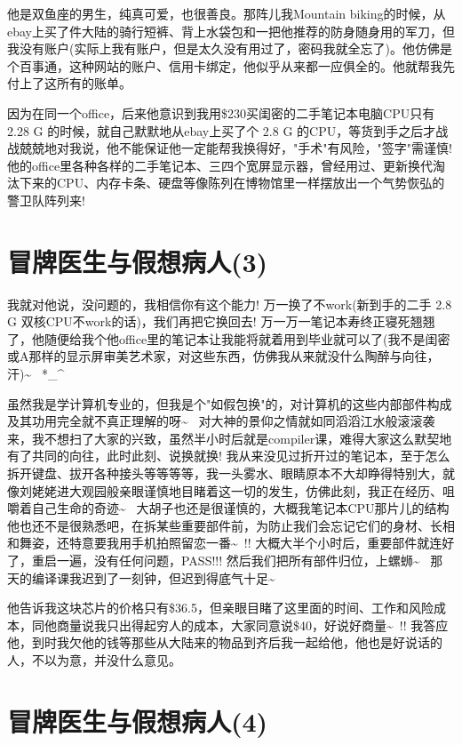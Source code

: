 \documentclass[12pt]{book}
\begin{document}
他是双鱼座的男生，纯真可爱，也很善良。那阵儿我Mountain biking的时候，从ebay上买了件大陆的骑行短裤、背上水袋包和一把他推荐的防身随身用的军刀，但我没有账户(实际上我有账户，但是太久没有用过了，密码我就全忘了)。他仿佛是个百事通，这种网站的账户、信用卡绑定，他似乎从来都一应俱全的。他就帮我先付上了这所有的账单。

因为在同一个office，后来他意识到我用\$230买闺密的二手笔记本电脑CPU只有 2.28 G 的时候，就自己默默地从ebay上买了个 2.8 G 的CPU，等货到手之后才战战兢兢地对我说，他不能保证他一定能帮我换得好，"手术"有风险，"签字"需谨慎! 他的office里各种各样的二手笔记本、三四个宽屏显示器，曾经用过、更新换代淘汰下来的CPU、内存卡条、硬盘等像陈列在博物馆里一样摆放出一个气势恢弘的警卫队阵列来!

\section{冒牌医生与假想病人(3)}
\label{sec-18-3}

我就对他说，没问题的，我相信你有这个能力! 万一换了不work(新到手的二手 2.8 G  双核CPU不work的话)，我们再把它换回去! 万一万一笔记本寿终正寝死翘翘了，他随便给我个他office里的笔记本让我能将就着用到毕业就可以了(我不是闺密或A那样的显示屏审美艺术家，对这些东西，仿佛我从来就没什么陶醉与向往，汗)\textasciitilde{}~ *\_\^{}

虽然我是学计算机专业的，但我是个"如假包换"的，对计算机的这些内部部件构成及其功用完全就不真正理解的呀\textasciitilde{}~ 对大神的景仰之情就如同滔滔江水般滚滚袭来，我不想扫了大家的兴致，虽然半小时后就是compiler课，难得大家这么默契地有了共同的向往，此时此刻、说换就换! 我从来没见过折开过的笔记本，至于怎么拆开键盘、拔开各种接头等等等等，我一头雾水、眼睛原本不大却睁得特别大，就像刘姥姥进大观园般亲眼谨慎地目睹着这一切的发生，仿佛此刻，我正在经历、咀嚼着自己生命的奇迹\textasciitilde{}~  大胡子也还是很谨慎的，大概我笔记本CPU那片儿的结构他也还不是很熟悉吧，在拆某些重要部件前，为防止我们会忘记它们的身材、长相和舞姿，还特意要我用手机拍照留恋一番\textasciitilde{}~!! 大概大半个小时后，重要部件就连好了，重启一遍，没有任何问题，PASS!!!  然后我们把所有部件归位，上螺蛳\textasciitilde{}~ 那天的编译课我迟到了一刻钟，但迟到得底气十足\textasciitilde{}~

他告诉我这块芯片的价格只有\$36.5，但亲眼目睹了这里面的时间、工作和风险成本，同他商量说我只出得起穷人的成本，大家同意说\$40，好说好商量\textasciitilde{}~!! 我答应他，到时我欠他的钱等那些从大陆来的物品到齐后我一起给他，他也是好说话的人，不以为意，并没什么意见。

\section{冒牌医生与假想病人(4)}
\label{sec-18-4}
\end{document}
